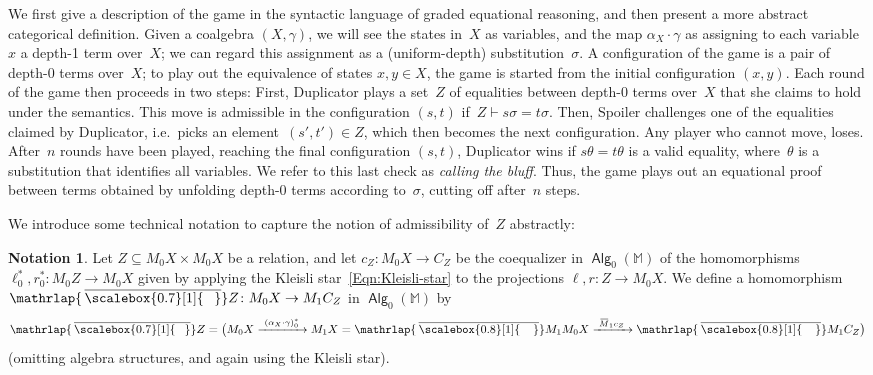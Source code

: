 \documentclass[sigconf,
			final%
			nonacm
                        ]{acmart}
\numberwithin{equation}{section}
\numberwithin{equation}{section}
\theoremstyle{plain}
\theoremstyle{definition}
\newtheorem{notn}[thm]{Notation}
\newcommand{\overbar}[1]{\mkern 1.5mu\overline{\mkern-2.5mu#1\mkern-1.5mu}\mkern 1.5mu}
\newcommand{\mybar}[3]{%
  \mathrlap{\hspace{#2}\overline{\scalebox{#1}[1]{\hphantom{\ensuremath{#3}}\vphantom{\rule{0pt}{5.5pt}}}}}\ensuremath{#3}
}
\newcommand{\barM}{\mybar{0.8}{2pt}{M}_1}
\newcommand{\barZ}{\mybar{0.7}{1.75pt}{Z}}
\newcommand{\xra}[1]{\xrightarrow{~#1~}}
\newcommand{\M}{\mathbb{M}}                   %
\DeclareMathOperator{\Alg}{\mathsf{Alg}}
\begin{document}
We first give a description of the game in the syntactic language of
graded equational reasoning, and then present a more abstract
categorical definition. Given a coalgebra $(X,\gamma)$, we will see
the states in~$X$ as variables, and the map $\alpha_X\cdot\gamma$ as
assigning to each variable~$x$ a depth-1 term over~$X$; we can regard
this assignment as a (uniform-depth) substitution~$\sigma$. A
configuration of the game is a pair of depth-0 terms over~$X$; to play
out the equivalence of states $x,y\in X$, the game is started from the
initial configuration $(x,y)$.  Each round of the game then proceeds
in two steps: First, Duplicator plays a set~$Z$ of equalities between
depth-0 terms over~$X$ that she claims to hold under the
semantics. This move is admissible in the configuration $(s,t)$
if~$Z\vdash s\sigma=t\sigma$. Then, Spoiler challenges one of the
equalities claimed by Duplicator, i.e.~picks an
element~$(s',t')\in Z$, which then becomes the next configuration. Any
player who cannot move, loses.  After~$n$ rounds have been played,
reaching the final configuration $(s,t)$, Duplicator wins if
$s\theta =t\theta$ is a valid equality, where~$\theta$ is a
substitution that identifies all variables. We refer to this last
check as \emph{calling the bluff}. Thus, the game plays out an
equational proof between terms obtained by unfolding depth-0 terms
according to~$\sigma$, cutting off after~$n$ steps.

We introduce some technical notation to capture the notion of
admissibility of~$Z$ abstractly:
\begin{notn}\label{N:admissible}
  Let $Z\subseteq M_0X\times M_0X$ be a relation, and let
  $c_Z\colon M_0X\to C_Z$ be the coequalizer in $\Alg_0(\M)$ of the
  homomorphisms $ \ell_0^*, r_0^*\colon M_0Z\to M_0X $ given by
  applying the Kleisli star~\eqref{Eqn:Kleisli-star} to the
  projections $\ell, r\colon Z\to M_0X$. We define a homomorphism
  $\barZ\colon M_0X\to M_1C_Z$ in $\Alg_0(\M)$ by
  \begin{equation}\label{eq:barZ}
    \barZ = \big(M_0X\xra{(\alpha_X\cdot\gamma)^*_0} M_1X = \barM M_0X
    \xra{\overbar M_1 c_Z} \barM C_Z\big)
  \end{equation}
  (omitting algebra structures, and again using the Kleisli star).
\end{notn}
\end{document}
